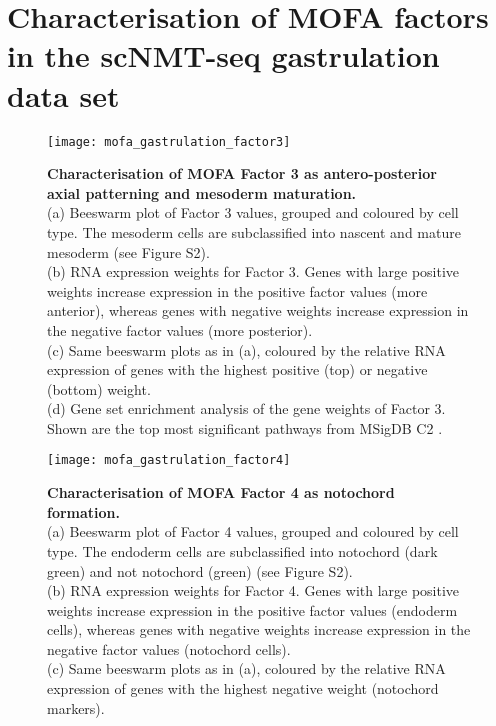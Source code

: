 \graphicspath{{Appendix/appendix_figures/}}

\chapter{Characterisation of MOFA factors in the scNMT-seq gastrulation data set} \label{appendix:mofa_gastrulation}

\begin{figure}[H]
	\centering
	\texttt{[image: mofa\_gastrulation\_factor3]}
	\caption[]{\textbf{Characterisation of MOFA Factor 3 as antero-posterior axial patterning and mesoderm maturation.} \\
	(a) Beeswarm plot of Factor 3 values, grouped and coloured by cell type. The mesoderm cells are subclassified into nascent and mature mesoderm (see Figure S2). \\
	(b) RNA expression weights for Factor 3. Genes with large positive weights increase expression in the positive factor values (more anterior), whereas genes with negative weights increase expression in the negative factor values (more posterior).\\
	(c) Same beeswarm plots as in (a), coloured by the relative RNA expression of genes with the highest positive (top) or negative (bottom) weight.\\
	(d) Gene set enrichment analysis of the gene weights of Factor 3. Shown are the top most significant pathways from MSigDB C2 \cite{Subramanian2005,Ashburner2000}.
	}
	\label{fig:mofa_gastrulation_factor3}
\end{figure}


\begin{figure}[H]
	\centering
	\texttt{[image: mofa\_gastrulation\_factor4]}
	\caption[]{\textbf{Characterisation of MOFA Factor 4 as notochord formation.} \\
		(a) Beeswarm plot of Factor 4 values, grouped and coloured by cell type. The endoderm cells are subclassified into notochord (dark green) and not notochord (green) (see Figure S2). \\
		(b) RNA expression weights for Factor 4. Genes with large positive weights increase expression in the positive factor values (endoderm cells), whereas genes with negative weights increase expression in the negative factor values (notochord cells).\\
		(c) Same beeswarm plots as in (a), coloured by the relative RNA expression of genes with the highest negative weight (notochord markers).
	}
	\label{fig:mofa_gastrulation_factor4}
\end{figure}


